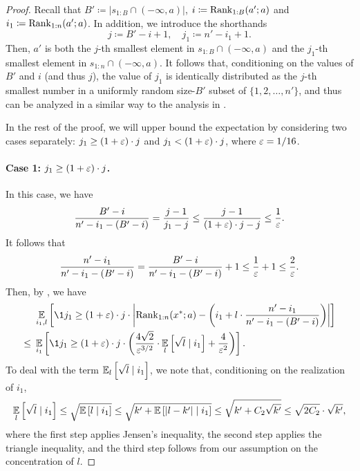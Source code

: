 \begin{proof}
Recall that $B' \coloneqq |s_{1:B} \cap (-\infty, a)|$, $i \coloneqq \mathrm{Rank}_{1:B}(a'; a)$ and $i_1 \coloneqq \mathrm{Rank}_{1:n}(a'; a)$. In addition, we introduce the shorthands
\[
    j \coloneqq B'-i+1,
\quad
    j_1 \coloneqq n'-i_1 +1.
\]
Then, $a'$ is both the $j$-th smallest element in $s_{1:B} \cap (-\infty, a)$ and the $j_1$-th smallest element in $s_{1:n} \cap (-\infty, a)$. It follows that, conditioning on the values of $B'$ and $i$ (and thus $j$), the value of $j_1$ is identically distributed as the $j$-th smallest number in a uniformly random size-$B'$ subset of $\{1, 2, \ldots, n'\}$, and thus can be analyzed in a similar way to the analysis in .

In the rest of the proof, we will upper bound the expectation by considering two cases separately: $j_1 \ge (1+\varepsilon)\cdot j$ and $j_1 < (1+\varepsilon)\cdot j$, where $\varepsilon = 1/16$.
\paragraph{Case 1: $j_1 \ge (1+\varepsilon)\cdot j$.}
In this case, we have
\[
    \frac{B'-i}{n'-i_1-(B'-i)} = \frac{j-1}{j_1 - j} \le \frac{j-1}{(1+\varepsilon)\cdot j - j} \le \frac{1}{\varepsilon}.
\]
It follows that
\[
    \frac{n' - i_1}{n' - i_1 - (B' - i)}
=   \frac{B' - i}{n' - i_1 - (B' - i)} + 1
\le \frac{1}{\varepsilon} + 1
\le \frac{2}{\varepsilon}.
\]
Then, by , we have
 \begin{equation}\begin{split}\label{eq:case-1-intermediate-bound}
    &~\Ex{i_1, l}{\1{j_1 \ge (1+\eps)\cdot j}\cdot\left|\rank_{{1:n}}(x^*; a) - \left(i_1+l\cdot \frac{n'-i_1}{n'-i_1-(B'-i)}\right)\right|}\\
\le &~\Ex{i_1}{\1{j_1 \ge (1+\eps)\cdot j}\cdot\left(\frac{4\sqrt{2}}{\eps^{3/2}}\cdot \Ex{l}{\sqrt{l}\mid i_1} + \frac{4}{\eps^2}\right)}.
\end{split}\end{equation}
To deal with the term $\operatorname*{\mathbb{E}}_{l}\left[\sqrt{l}\mid i_1\right]$, we note that, conditioning on the realization of $i_1$, 
\begin{equation}\label{eq:sqrt-l-bound}
    \operatorname*{\mathbb{E}}_{l}\left[\sqrt{l} \mid i_1\right]
\le \sqrt{\operatorname*{\mathbb{E}}_{}\left[l \mid i_1\right]}
\le \sqrt{k' + \operatorname*{\mathbb{E}}_{}\left[|l - k'| \mid i_1\right]}
\le \sqrt{k' + C_2\sqrt{k'}}
\le \sqrt{2C_2}\cdot\sqrt{k'},
\end{equation}
where the first step applies Jensen's inequality, the second step applies the triangle inequality, and the third step follows from our assumption on the concentration of $l$.



\end{proof}
